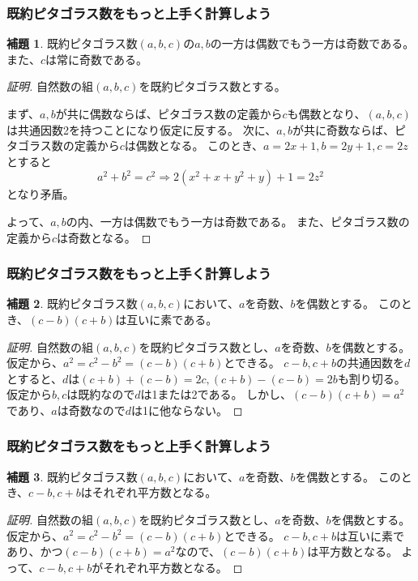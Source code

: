 \documentclass[dvipdfmx,11pt,notheorems]{beamer}
\theoremstyle{definition}
\newtheorem{lemma}{補題}
\begin{document}
\begin{frame}\frametitle{既約ピタゴラス数をもっと上手く計算しよう}

\begin{lemma}
既約ピタゴラス数$(a, b, c)$の$a, b$の一方は偶数でもう一方は奇数である。
また、$c$は常に奇数である。
\end{lemma}

\begin{proof}[証明]
自然数の組$(a, b, c)$を既約ピタゴラス数とする。

まず、$a, b$が共に偶数ならば、ピタゴラス数の定義から$c$も偶数となり、$(a, b, c)$は共通因数2を持つことになり仮定に反する。
次に、$a, b$が共に奇数ならば、ピタゴラス数の定義から$c$は偶数となる。
このとき、$a = 2x + 1, b = 2y + 1, c = 2z$とすると
\begin{equation*}
a^{2} + b^{2} = c^{2} \Rightarrow 2(x^{2} + x + y^{2} + y) + 1 = 2z^{2}
\end{equation*}
となり矛盾。

よって、$a, b$の内、一方は偶数でもう一方は奇数である。
また、ピタゴラス数の定義から$c$は奇数となる。
\end{proof}

\end{frame}

\begin{frame}\frametitle{既約ピタゴラス数をもっと上手く計算しよう}
\begin{lemma}
既約ピタゴラス数$(a, b, c)$において、$a$を奇数、$b$を偶数とする。
このとき、$(c-b)(c+b)$は互いに素である。
\end{lemma}

\begin{proof}[証明]
自然数の組$(a, b, c)$を既約ピタゴラス数とし、$a$を奇数、$b$を偶数とする。
仮定から、$a^{2} = c^{2} -b^{2} = (c-b)(c+b)$とできる。
$c-b, c+b$の共通因数を$d$とすると、$d$は$(c+b)+(c-b)=2c, (c+b)-(c-b)=2b$も割り切る。
仮定から$b, c$は既約なので$d$は1または2である。
しかし、$(c-b)(c+b)=a^{2}$であり、$a$は奇数なので$d$は1に他ならない。

\end{proof}

\end{frame}

\begin{frame}\frametitle{既約ピタゴラス数をもっと上手く計算しよう}
\begin{lemma}
既約ピタゴラス数$(a, b, c)$において、$a$を奇数、$b$を偶数とする。
このとき、$c-b, c+b$はそれぞれ平方数となる。
\end{lemma}

\begin{proof}[証明]
自然数の組$(a, b, c)$を既約ピタゴラス数とし、$a$を奇数、$b$を偶数とする。
仮定から、$a^{2} = c^{2} -b^{2} = (c-b)(c+b)$とできる。
$c-b, c+b$は互いに素であり、かつ$(c-b)(c+b)=a^{2}$なので、$(c-b)(c+b)$は平方数となる。
よって、$c-b, c+b$がそれぞれ平方数となる。
\end{proof}

\end{frame}
\end{document}

